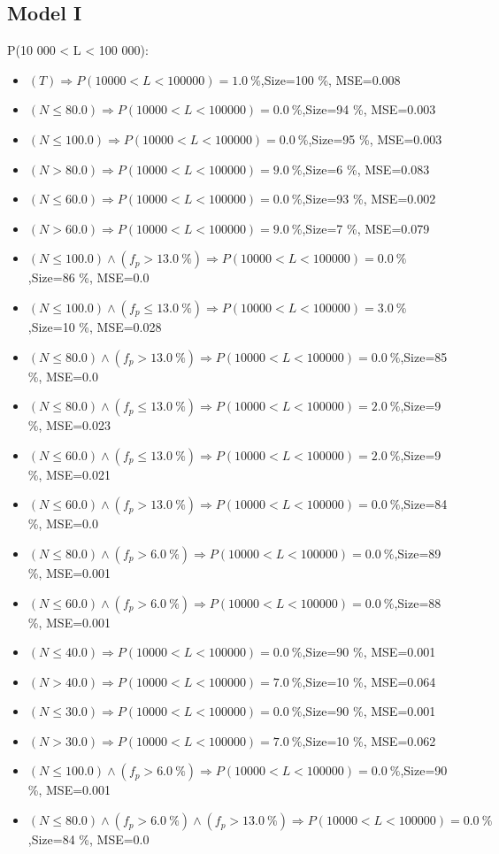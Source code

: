 \documentclass[numbered]{CSL}
\begin{document}
\subsection{Model I}
P(10 000 < L < 100 000):
\begin{itemize}
\item $(T) \Rightarrow P(10 000 < L < 100 000) = 1.0~\%$,\hfill Size=100 \%, MSE=0.008
\item $(N \leq 80.0) \Rightarrow P(10 000 < L < 100 000) = 0.0~\%$,\hfill Size=94 \%, MSE=0.003
\item $(N \leq 100.0) \Rightarrow P(10 000 < L < 100 000) = 0.0~\%$,\hfill Size=95 \%, MSE=0.003
\item $(N > 80.0) \Rightarrow P(10 000 < L < 100 000) = 9.0~\%$,\hfill Size=6 \%, MSE=0.083
\item $(N \leq 60.0) \Rightarrow P(10 000 < L < 100 000) = 0.0~\%$,\hfill Size=93 \%, MSE=0.002
\item $(N > 60.0) \Rightarrow P(10 000 < L < 100 000) = 9.0~\%$,\hfill Size=7 \%, MSE=0.079
\item $(N \leq 100.0) \land (f_p > 13.0~\%) \Rightarrow P(10 000 < L < 100 000) = 0.0~\%$,\hfill Size=86 \%, MSE=0.0
\item $(N \leq 100.0) \land (f_p \leq 13.0~\%) \Rightarrow P(10 000 < L < 100 000) = 3.0~\%$,\hfill Size=10 \%, MSE=0.028
\item $(N \leq 80.0) \land (f_p > 13.0~\%) \Rightarrow P(10 000 < L < 100 000) = 0.0~\%$,\hfill Size=85 \%, MSE=0.0
\item $(N \leq 80.0) \land (f_p \leq 13.0~\%) \Rightarrow P(10 000 < L < 100 000) = 2.0~\%$,\hfill Size=9 \%, MSE=0.023
\item $(N \leq 60.0) \land (f_p \leq 13.0~\%) \Rightarrow P(10 000 < L < 100 000) = 2.0~\%$,\hfill Size=9 \%, MSE=0.021
\item $(N \leq 60.0) \land (f_p > 13.0~\%) \Rightarrow P(10 000 < L < 100 000) = 0.0~\%$,\hfill Size=84 \%, MSE=0.0
\item $(N \leq 80.0) \land (f_p > 6.0~\%) \Rightarrow P(10 000 < L < 100 000) = 0.0~\%$,\hfill Size=89 \%, MSE=0.001
\item $(N \leq 60.0) \land (f_p > 6.0~\%) \Rightarrow P(10 000 < L < 100 000) = 0.0~\%$,\hfill Size=88 \%, MSE=0.001
\item $(N \leq 40.0) \Rightarrow P(10 000 < L < 100 000) = 0.0~\%$,\hfill Size=90 \%, MSE=0.001
\item $(N > 40.0) \Rightarrow P(10 000 < L < 100 000) = 7.0~\%$,\hfill Size=10 \%, MSE=0.064
\item $(N \leq 30.0) \Rightarrow P(10 000 < L < 100 000) = 0.0~\%$,\hfill Size=90 \%, MSE=0.001
\item $(N > 30.0) \Rightarrow P(10 000 < L < 100 000) = 7.0~\%$,\hfill Size=10 \%, MSE=0.062
\item $(N \leq 100.0) \land (f_p > 6.0~\%) \Rightarrow P(10 000 < L < 100 000) = 0.0~\%$,\hfill Size=90 \%, MSE=0.001
\item $(N \leq 80.0) \land (f_p > 6.0~\%) \land (f_p > 13.0~\%) \Rightarrow P(10 000 < L < 100 000) = 0.0~\%$,\hfill Size=84 \%, MSE=0.0
\end{itemize}
\end{document}

